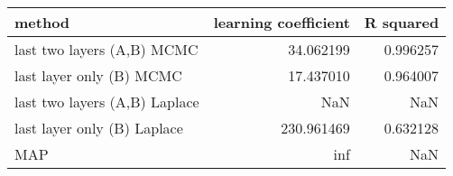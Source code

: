 \begin{tabular}{lrr}
\toprule
                        method &  learning coefficient &  R squared \\
\midrule
    last two layers (A,B) MCMC &             34.062199 &   0.996257 \\
      last layer only (B) MCMC &             17.437010 &   0.964007 \\
 last two layers (A,B) Laplace &                   NaN &        NaN \\
   last layer only (B) Laplace &            230.961469 &   0.632128 \\
                           MAP &                   inf &        NaN \\
\bottomrule
\end{tabular}
